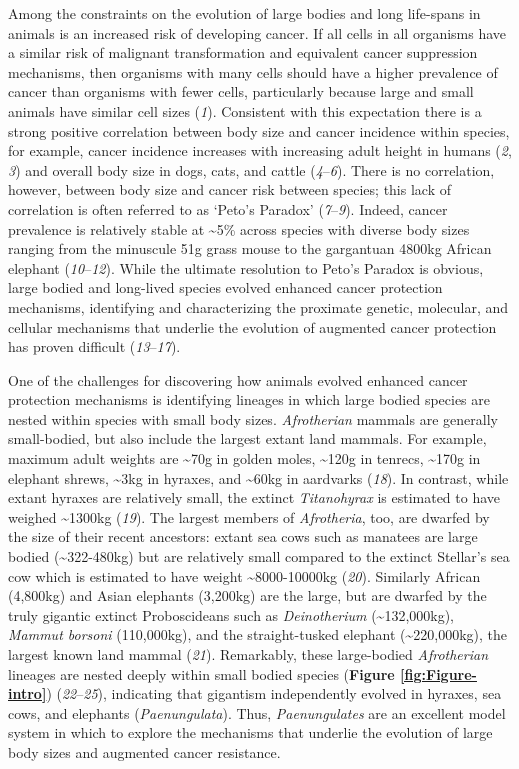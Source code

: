 \documentclass[]{elsarticle} %
\begin{document}
Among the constraints on the evolution of large bodies and long life-spans in animals is an increased risk of developing cancer. If all cells in all organisms have a similar risk of malignant transformation and equivalent cancer suppression mechanisms, then organisms with many cells should have a higher prevalence of cancer than organisms with fewer cells, particularly because large and small animals have similar cell sizes (\emph{1}). Consistent with this expectation there is a strong positive correlation between body size and cancer incidence within species, for example, cancer incidence increases with increasing adult height in humans (\emph{2}, \emph{3}) and overall body size in dogs, cats, and cattle (\emph{4}--\emph{6}). There is no correlation, however, between body size and cancer risk between species; this lack of correlation is often referred to as `Peto's Paradox' (\emph{7}--\emph{9}). Indeed, cancer prevalence is relatively stable at \textasciitilde5\% across species with diverse body sizes ranging from the minuscule 51g grass mouse to the gargantuan 4800kg African elephant (\emph{10}--\emph{12}). While the ultimate resolution to Peto's Paradox is obvious, large bodied and long-lived species evolved enhanced cancer protection mechanisms, identifying and characterizing the proximate genetic, molecular, and cellular mechanisms that underlie the evolution of augmented cancer protection has proven difficult (\emph{13}--\emph{17}).

One of the challenges for discovering how animals evolved enhanced cancer protection mechanisms is identifying lineages in which large bodied species are nested within species with small body sizes. \emph{Afrotherian} mammals are generally small-bodied, but also include the largest extant land mammals. For example, maximum adult weights are \textasciitilde70g in golden moles, \textasciitilde120g in tenrecs, \textasciitilde170g in elephant shrews, \textasciitilde3kg in hyraxes, and \textasciitilde60kg in aardvarks (\emph{18}). In contrast, while extant hyraxes are relatively small, the extinct \emph{Titanohyrax} is estimated to have weighed \textasciitilde1300kg (\emph{19}). The largest members of \emph{Afrotheria}, too, are dwarfed by the size of their recent ancestors: extant sea cows such as manatees are large bodied (\textasciitilde322-480kg) but are relatively small compared to the extinct Stellar's sea cow which is estimated to have weight \textasciitilde8000-10000kg (\emph{20}). Similarly African (4,800kg) and Asian elephants (3,200kg) are the large, but are dwarfed by the truly gigantic extinct Proboscideans such as \emph{Deinotherium} (\textasciitilde132,000kg), \emph{Mammut borsoni} (110,000kg), and the straight-tusked elephant (\textasciitilde220,000kg), the largest known land mammal (\emph{21}). Remarkably, these large-bodied \emph{Afrotherian} lineages are nested deeply within small bodied species (\textbf{Figure \ref{fig:Figure-intro}}) (\emph{22}--\emph{25}), indicating that gigantism independently evolved in hyraxes, sea cows, and elephants (\emph{Paenungulata}). Thus, \emph{Paenungulates} are an excellent model system in which to explore the mechanisms that underlie the evolution of large body sizes and augmented cancer resistance.
\end{document}

